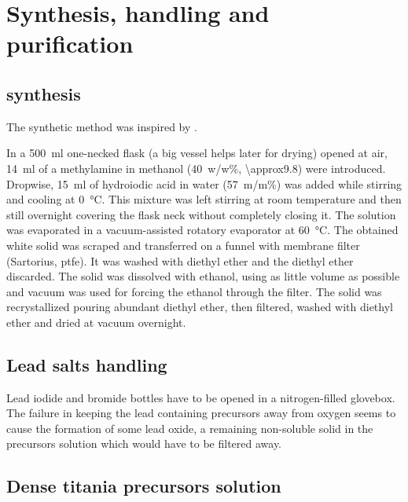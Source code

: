 
\section{Synthesis, handling and purification}

	\subsection{ synthesis}\label{methods-MAI}


		The synthetic method was inspired by \cite{Im2011a, Aharon2014, Williams2014, Etgar2012a, Nagaoka2015}.

		In a \SI{500}{\ml} one-necked flask (a big vessel helps later for drying) opened at air, \SI{14}{\ml} of a methylamine in methanol (40~w/w\%, \SI{\approx9.8}{\Molar}) were introduced. Dropwise, \SI{15}{\ml} of hydroiodic acid in water (57~m/m\%) was added while stirring and cooling at \SI{0}{\celsius}. This mixture was left stirring at room temperature and then still overnight covering the flask neck without completely closing it.
		The solution was evaporated in a vacuum-assisted rotatory evaporator at \SI{60}{\celsius}.
		The obtained white solid was scraped and transferred on a funnel with membrane filter (Sartorius, \gls{ptfe}). It was washed with diethyl ether and the diethyl ether discarded. The solid was dissolved with ethanol, using as little volume as possible and vacuum was used for forcing the ethanol through the filter. The solid was recrystallized pouring abundant diethyl ether, then filtered, washed with diethyl ether and dried at vacuum overnight.

	\subsection{Lead salts handling}

		Lead iodide and bromide bottles have to be opened in a nitrogen-filled glovebox. The failure in keeping the lead containing precursors away from oxygen seems to cause the formation of some lead oxide, a remaining non-soluble solid in the precursors solution which would have to be filtered away.

	\subsection{Dense titania precursors solution}\label{precursors_tio2}


